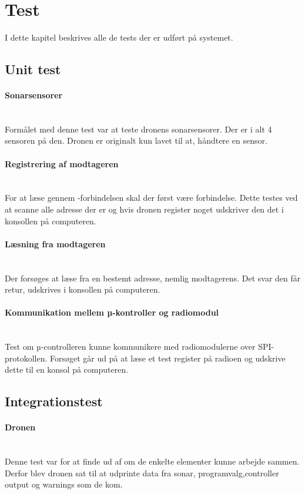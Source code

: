 \documentclass[Main]{subfiles}
\begin{document}
\section{Test}
I dette kapitel beskrives alle de tests der er udført på systemet.

\subsection{Unit test}

\paragraph{Sonarsensorer}\mbox{}\\
Formålet med denne test var at teste dronens sonarsensorer. Der er i alt 4 sensoren på den. Dronen er originalt kun lavet til at, håndtere en sensor.

\paragraph{Registrering af modtageren}\mbox{}\\
For at læse gennem \itoc -forbindelsen skal der først være forbindelse. Dette testes ved at scanne alle adresse der er og hvis dronen register noget udskriver den det i konsollen på computeren.

\paragraph{Læsning fra modtageren}\mbox{}\\
Der forsøges at læse fra en bestemt adresse, nemlig modtagerens.
Det svar den får retur, udskrives i konsollen på computeren.

\paragraph{Kommunikation mellem µ-kontroller og radiomodul}\mbox{}\\
Test om µ-controlleren kunne kommunikere med radiomodulerne over SPI-protokollen. Forsøget går ud på at læse et test register på radioen og udskrive dette til en konsol på computeren.

\subsection{Integrationstest}
\paragraph{Dronen}\mbox{}\\
Denne test var for at finde ud af om de enkelte elementer kunne arbejde sammen. Derfor blev dronen sat til at udprinte data fra sonar, programvalg,controller output og warnings som de kom.
\end{document}
